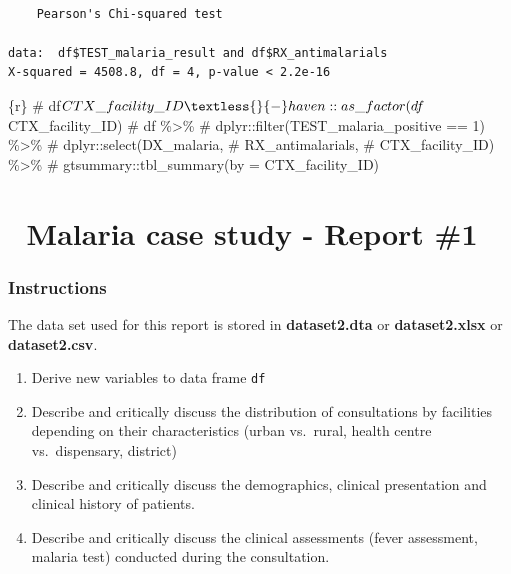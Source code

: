 \documentclass[
  letterpaper,
  DIV=11,
  numbers=noendperiod,
  oneside]{scrreprt}
\newenvironment{Shaded}{\begin{snugshade}}{\end{snugshade}}
\newcommand{\CommentTok}[1]{\textcolor[rgb]{0.37,0.37,0.37}{#1}}
\newcommand{\InformationTok}[1]{\textcolor[rgb]{0.37,0.37,0.37}{#1}}
\providecommand{\tightlist}{%
  \setlength{\itemsep}{0pt}\setlength{\parskip}{0pt}}\usepackage{longtable,booktabs,array}
\begin{document}
\begin{verbatim}

    Pearson's Chi-squared test

data:  df$TEST_malaria_result and df$RX_antimalarials
X-squared = 4508.8, df = 4, p-value < 2.2e-16
\end{verbatim}

\begin{Shaded}
\begin{Highlighting}[]
\InformationTok{\textasciigrave{}\textasciigrave{}\textasciigrave{}\{r\}}
\CommentTok{\# df$CTX\_facility\_ID \textless{}{-} haven::as\_factor(df$CTX\_facility\_ID) }
\CommentTok{\# df \%\textgreater{}\%}
\CommentTok{\#   dplyr::filter(TEST\_malaria\_positive == 1) \%\textgreater{}\%}
\CommentTok{\#   dplyr::select(DX\_malaria,}
\CommentTok{\#                 RX\_antimalarials,}
\CommentTok{\#                 CTX\_facility\_ID) \%\textgreater{}\%}
\CommentTok{\#   gtsummary::tbl\_summary(by = CTX\_facility\_ID)}
\InformationTok{\textasciigrave{}\textasciigrave{}\textasciigrave{}}
\end{Highlighting}
\end{Shaded}

\hypertarget{malaria-case-study---report-1}{%
\chapter{\texorpdfstring{{📙} Malaria case study - Report
\#1}{📙 Malaria case study - Report \#1}}\label{malaria-case-study---report-1}}

\hypertarget{instructions}{%
\subsection{Instructions}\label{instructions}}

The data set used for this report is stored in \textbf{dataset2.dta} or
\textbf{dataset2.xlsx} or \textbf{dataset2.csv}.

\begin{enumerate}
\def\labelenumi{\arabic{enumi}.}
\tightlist
\item
  Derive new variables to data frame \texttt{df}
\item
  Describe and critically discuss the distribution of consultations by
  facilities depending on their characteristics (urban vs.~rural, health
  centre vs.~dispensary, district)
\item
  Describe and critically discuss the demographics, clinical
  presentation and clinical history of patients.
\item
  Describe and critically discuss the clinical assessments (fever
  assessment, malaria test) conducted during the consultation.
\end{enumerate}
\end{document}
